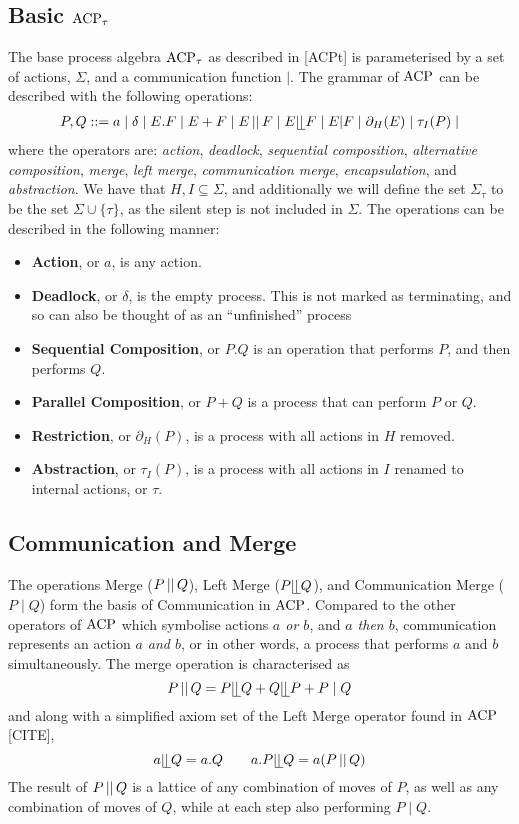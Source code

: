 \documentclass[../hons_project.tex]{subfiles}
\begin{document}
\subsection{Basic \texorpdfstring{$\acpt$}{acpt}}
The base process algebra $\acpt$ as described in [ACPt] is parameterised by a set of actions, $\Sigma$, and a communication function $|$. The grammar of $\acp$ can be described with the following operations:
\begin{align*}
   P, Q ::= a \mid \delta \mid E . F \mid E + F \mid E \merge F \mid E \leftmerge F \mid E | F \mid \restrict(E) \mid \tau_{I}(P) \mid
\end{align*}
where the operators are: \textit{action}, \textit{deadlock}, \textit{sequential composition}, \textit{alternative composition},  \textit{merge}, \textit{left merge}, \textit{communication merge}, \textit{encapsulation}, and \textit{abstraction}.
We have that $H, I \subseteq \Sigma$, and additionally we will define the set $\Sigma_{\tau}$ to be the set $\Sigma \cup \{\tau\}$, as the silent step is not included in $\Sigma$. The operations can be described in the following manner:



\begin{itemize}
   \item \textbf{Action}, or $a$, is any action.
   \item \textbf{Deadlock}, or $\delta$, is the empty process. This is not marked as terminating, and so can also be thought of as an ``unfinished'' process
   \item \textbf{Sequential Composition}, or $P . Q$ is an operation that performs $P$, and then performs $Q$.
   \item \textbf{Parallel Composition}, or $P + Q$ is a process that can perform $P$ or $Q$. 
   \item \textbf{Restriction}, or $\partial_{H}(P)$, is a process with all actions in $H$ removed.
   \item \textbf{Abstraction}, or $\tau_{I}(P)$, is a process with all actions in $I$ renamed to internal actions, or $\tau$.
\end{itemize}

\subsection{Communication and Merge}\label{ssec:acp-communication}
The operations Merge ($P \merge Q$), Left Merge ($P \leftmerge Q$), and Communication Merge ($P \mid Q$) form the basis of Communication in $\acp$. Compared to the other operators of $\acp$ which symbolise actions \textit{$a$ or $b$}, and \textit{$a$ then $b$}, communication represents an action \textit{$a$ and $b$}, or in other words, a process that performs $a$ and $b$ simultaneously. The merge operation is characterised as 
\[P \merge Q = P \leftmerge Q + Q \leftmerge P + P \mid Q\]
and along with a simplified axiom set of the Left Merge operator found in $\acp$ [CITE], 
\[a \leftmerge Q = a.Q \qquad a.P \leftmerge Q = a(P \merge Q)\]
The result of $P \merge Q$ is a lattice of any combination of moves of $P$, as well as any combination of moves of $Q$, while at each step also performing $P \mid Q$. 
\end{document}
